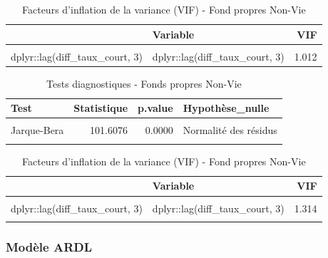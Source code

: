 \documentclass[
]{article}
\begin{document}
\begin{longtable}[t]{llr}
\caption{\label{tab:unnamed-chunk-50}Facteurs d'inflation de la variance (VIF) - Fond propres Non-Vie}\\
\toprule
 & Variable & VIF\\
\midrule
\cellcolor{gray!10}{dplyr::lag(diff\_scr, 1)} & \cellcolor{gray!10}{dplyr::lag(diff\_scr, 1)} & \cellcolor{gray!10}{1.012}\\
dplyr::lag(diff\_taux\_court, 3) & dplyr::lag(diff\_taux\_court, 3) & 1.012\\
\bottomrule
\end{longtable}

\begin{longtable}[t]{lrrl}
\caption{\label{tab:unnamed-chunk-51}Tests diagnostiques - Fonds propres Non-Vie}\\
\toprule
Test & Statistique & p.value & Hypothèse\_nulle\\
\midrule
\cellcolor{gray!10}{Ljung-Box} & \cellcolor{gray!10}{0.0211} & \cellcolor{gray!10}{0.8846} & \cellcolor{gray!10}{Pas d'autocorrélation}\\
Jarque-Bera & 101.6076 & 0.0000 & Normalité des résidus\\
\cellcolor{gray!10}{Breusch-Pagan} & \cellcolor{gray!10}{2.7860} & \cellcolor{gray!10}{0.4258} & \cellcolor{gray!10}{Homoscédasticité}\\
\bottomrule
\end{longtable}

\begin{longtable}[t]{llr}
\caption{\label{tab:unnamed-chunk-51}Facteurs d'inflation de la variance (VIF) - Fond propres Non-Vie}\\
\toprule
 & Variable & VIF\\
\midrule
\cellcolor{gray!10}{dplyr::lag(diff\_ratio, 1)} & \cellcolor{gray!10}{dplyr::lag(diff\_ratio, 1)} & \cellcolor{gray!10}{1.083}\\
dplyr::lag(diff\_taux\_court, 3) & dplyr::lag(diff\_taux\_court, 3) & 1.314\\
\cellcolor{gray!10}{dplyr::lag(diff\_taux\_long, 3)} & \cellcolor{gray!10}{dplyr::lag(diff\_taux\_long, 3)} & \cellcolor{gray!10}{1.321}\\
\bottomrule
\end{longtable}

\subsubsection{Modèle ARDL}\label{moduxe8le-ardl-1}
\end{document}
